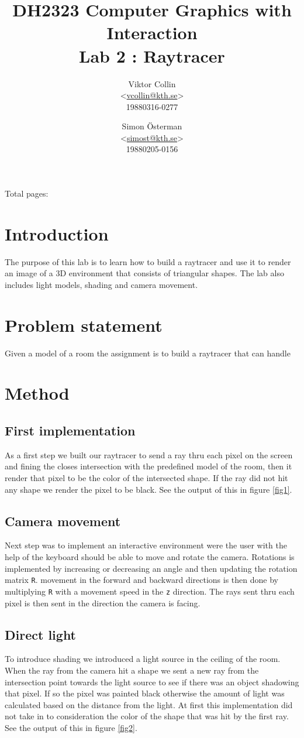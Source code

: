 \documentclass[a4paper,11pt]{article}
\author{Viktor Collin \\ <\url{vcollin@kth.se}> \\ 19880316-0277 \and Simon \"{O}sterman \\ <\url{simost@kth.se}> \\ 19880205-0156}
\title{\textbf{DH2323 Computer Graphics with Interaction \\ Lab 2 : Raytracer}}
\begin{document}
\maketitle
\begin{center}
Total pages: \pageref{LastPage}
\end{center}
\thispagestyle{empty}

\clearpage
\setcounter{page}{1}
\section{Introduction}
The purpose of this lab is to learn how to build a raytracer and use it to render an image of a 3D environment that consists of triangular shapes. The lab also includes light models, shading and camera movement. 
\section{Problem statement}
Given a model of a room the assignment is to build a raytracer that can handle 
\section{Method}
\subsection{First implementation}
As a first step we built our raytracer to send a ray thru each pixel on the screen and fining the closes intersection with the predefined model of the room, then it render that pixel to be the color of the intersected shape. If the ray did not hit any shape we  render the pixel to be black. See the output of this in figure \ref{fig1}.

\subsection{Camera movement}
Next step was to implement an interactive environment were the user with the help of the keyboard should be able to move and rotate the camera. Rotations is implemented by increasing or decreasing an angle and then updating the rotation matrix \verb|R|. movement in the forward and backward directions is then done by multiplying \verb|R| with a movement speed in the \verb|z| direction. The rays sent thru each pixel is then sent in the direction the camera is facing.

\subsection{Direct light}
To introduce shading we introduced a light source in the ceiling of the room. When the ray from the camera hit a shape we sent a new ray from the intersection point towards the light source to see if there was an object shadowing that pixel. If so the pixel was painted black otherwise the amount of light was calculated based on the distance from the light. At first this implementation did not take in to consideration the color of the shape that was hit by the first ray. See the output of this in figure \ref{fig2}.  
\end{document}
